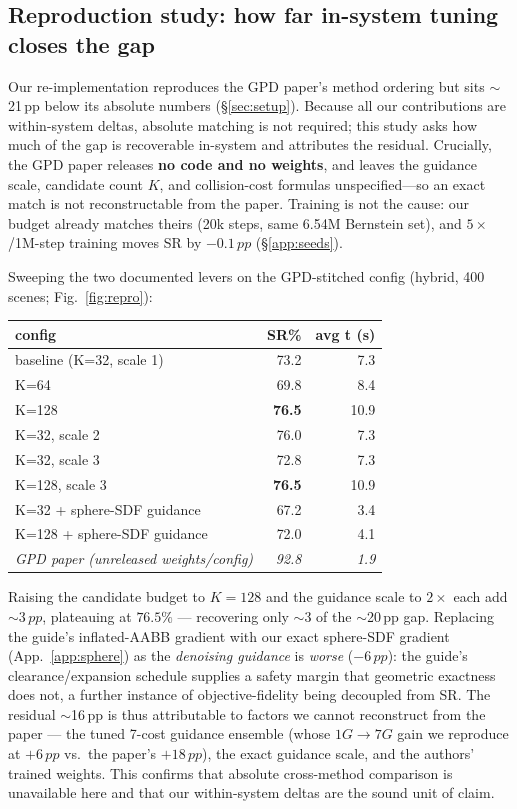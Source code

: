\documentclass[10pt,twocolumn]{article}
\newcommand{\pp}{\,pp}
\begin{document}
\subsection{Reproduction study: how far in-system tuning closes the gap}
\label{app:repro}
Our re-implementation reproduces the GPD paper's method ordering but sits
$\sim$21\pp{} below its absolute numbers (\S\ref{sec:setup}). Because all our
contributions are within-system deltas, absolute matching is not required; this
study asks how much of the gap is recoverable in-system and attributes the residual.
Crucially, the GPD paper releases \textbf{no code and no weights}, and leaves the
guidance scale, candidate count $K$, and collision-cost formulas unspecified---so an
exact match is not reconstructable from the paper. Training is not the cause: our
budget already matches theirs (20k steps, same 6.54M Bernstein set), and
$5\times$/1M-step training moves SR by $-0.1\pp$ (\S\ref{app:seeds}).

Sweeping the two documented levers on the GPD-stitched config (hybrid, 400 scenes;
Fig.~\ref{fig:repro}):

\begin{center}\small
\begin{tabular}{lrr}
\toprule
config & SR\% & avg t (s) \\
\midrule
baseline (K=32, scale 1) & 73.2 & 7.3 \\
K=64 & 69.8 & 8.4 \\
K=128 & \textbf{76.5} & 10.9 \\
K=32, scale 2 & 76.0 & 7.3 \\
K=32, scale 3 & 72.8 & 7.3 \\
K=128, scale 3 & \textbf{76.5} & 10.9 \\
K=32 + sphere-SDF guidance & 67.2 & 3.4 \\
K=128 + sphere-SDF guidance & 72.0 & 4.1 \\
\midrule
\emph{GPD paper (unreleased weights/config)} & \emph{92.8} & \emph{1.9} \\
\bottomrule
\end{tabular}
\end{center}

Raising the candidate budget to $K{=}128$ and the guidance scale to $2\times$ each
add $\sim$$3\pp$, plateauing at $\mathbf{76.5\%}$ --- recovering only $\sim$3 of the
$\sim$20\pp{} gap. Replacing the guide's inflated-AABB gradient with our exact
sphere-SDF gradient (App.~\ref{app:sphere}) as the \emph{denoising guidance} is
\emph{worse} ($-6\pp$): the guide's clearance/expansion schedule supplies a safety
margin that geometric exactness does not, a further instance of objective-fidelity
being decoupled from SR. The residual $\sim$16\pp{} is thus attributable to factors
we cannot reconstruct from the paper --- the tuned 7-cost guidance ensemble (whose
$1G\!\to\!7G$ gain we reproduce at $+6\pp$ vs.\ the paper's $+18\pp$), the exact
guidance scale, and the authors' trained weights. This confirms that absolute
cross-method comparison is unavailable here and that our within-system deltas are the
sound unit of claim.
\end{document}
